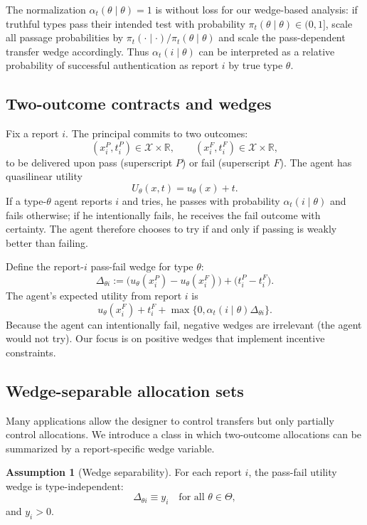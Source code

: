 \documentclass[final,3p,times]{elsarticle}
\theoremstyle{plain}
\theoremstyle{definition}
\newtheorem{assumption}{Assumption}
\newcommand{\R}{\mathbb{R}}
\newcommand{\1}{\mathbbm{1}}
\newcommand{\ThetaSet}{\Theta}
\newcommand{\cX}{\mathcal{X}}
\begin{document}
The normalization $\alpha_t(\theta\mid \theta)=1$ is without loss for our wedge-based analysis: if truthful types pass their intended test with probability $\pi_t(\theta\mid\theta)\in(0,1]$, scale all passage probabilities by $\pi_t(\cdot\mid\cdot)/\pi_t(\theta\mid\theta)$ and scale the pass-dependent transfer wedge accordingly. Thus $\alpha_t(i\mid\theta)$ can be interpreted as a relative probability of successful authentication as report $i$ by true type $\theta$.

\subsection{Two-outcome contracts and wedges}

Fix a report $i$. The principal commits to two outcomes:
\[
(x_i^P,t_i^P)\in\cX\times\R,\qquad (x_i^F,t_i^F)\in\cX\times\R,
\]
to be delivered upon pass (superscript $P$) or fail (superscript $F$). The agent has quasilinear utility
\[
U_\theta(x,t)=u_\theta(x)+t.
\]
If a type-$\theta$ agent reports $i$ and tries, he passes with probability $\alpha_t(i\mid\theta)$ and fails otherwise; if he intentionally fails, he receives the fail outcome with certainty. The agent therefore chooses to try if and only if passing is weakly better than failing.

Define the report-$i$ pass-fail wedge for type $\theta$:
\[
\Delta_{\theta i}:=\big(u_\theta(x_i^P)-u_\theta(x_i^F)\big)+\big(t_i^P-t_i^F\big).
\]
The agent's expected utility from report $i$ is
\[
u_\theta(x_i^F)+t_i^F + \max\{0,\alpha_t(i\mid\theta)\Delta_{\theta i}\}.
\]
Because the agent can intentionally fail, negative wedges are irrelevant (the agent would not try). Our focus is on positive wedges that implement incentive constraints.

\subsection{Wedge-separable allocation sets}

Many applications allow the designer to control transfers but only partially control allocations. We introduce a class in which two-outcome allocations can be summarized by a report-specific wedge variable.

\begin{assumption}[Wedge separability]\label{ass:wedge-sep}
For each report $i$, the pass-fail utility wedge is type-independent:
\[
\Delta_{\theta i}\equiv y_i\quad\text{for all }\theta\in\ThetaSet,
\]
and $y_i>0$.
\end{assumption}
\end{document}
